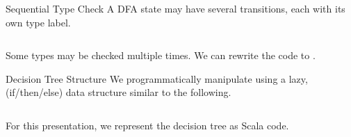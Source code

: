 \newsavebox\typecaseJhbox
\begin{lrbox}{\typecaseJhbox}
  \begin{minipage}{8cm}
    
  \end{minipage}
\end{lrbox}

\newsavebox\typecaseKbox
\begin{lrbox}{\typecaseKbox}
  \begin{minipage}{8cm}
    
  \end{minipage}
\end{lrbox}


\newsavebox\typecaseKhbox
\begin{lrbox}{\typecaseKhbox}
  \begin{minipage}{8cm}
    
  \end{minipage}
\end{lrbox}



\begin{frame}{Sequential Type Check}
  A DFA state may have several  transitions, each with its own type label.
  \begin{columns}
    \begin{column}{0.5\textwidth}
      \usebox\typecaseAbox
    \end{column}
    \begin{column}{0.5\textwidth}  %
      \scalebox{0.9}{}
    \end{column}    
  \end{columns}

  Some types may be checked multiple times.  We can rewrite the code to .
\end{frame}

\begin{frame}{Decision Tree Structure}
  We programmatically manipulate  using a lazy,  (if/then/else) data structure similar to the following.

  \begin{columns}
    \begin{column}{0.5\textwidth}
      \usebox\typecaseAbox
    \end{column}
    \begin{column}{0.5\textwidth}  %
      \usebox\typecaseITEbox
    \end{column}    
  \end{columns}

  For this presentation, we represent the decision tree as  Scala code.
\end{frame}

